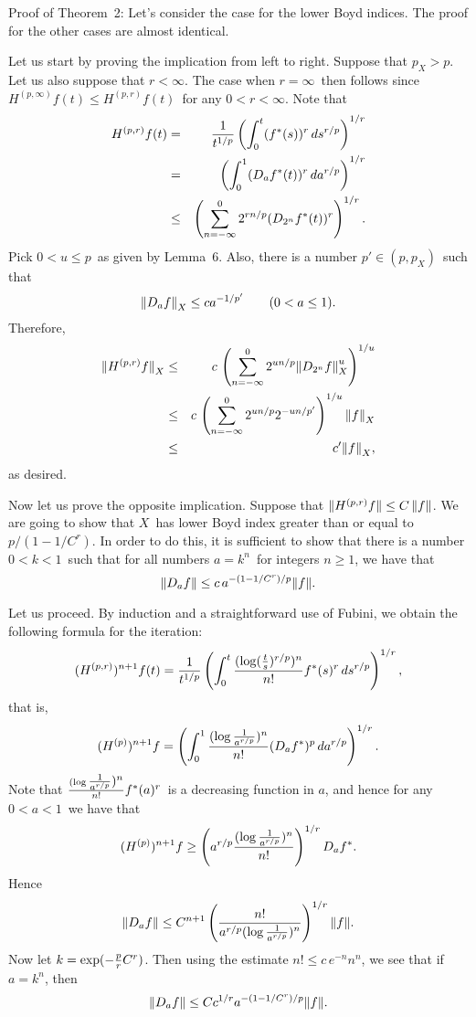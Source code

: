\noindent
Proof of Theorem~2:
Let's consider the case for the lower Boyd indices.  The proof for the
other cases are almost identical.

Let us start by proving the implication from left to right.
Suppose that $p_X > p$.  Let us also suppose that $r < \infty$.  The
case when $r = \infty$\ then follows since $H^{(p,\infty)}f(t) \le
H^{(p,r)}f(t)$\ for any $0<r<\infty$.
Note that
\begin{eqnarray*}
   H^{(p,r)} f(t)
   &=&
   {1\over t^{1/p}}\left(\int_0^t (f^*(s))^r \, ds^{r/p} \right)^{1/r} \\
   &=&
   \left(\int_0^1 (D_af^*(t))^r \, da^{r/p}\right)^{1/r} \\
   &\le&
   \left(\sum_{n=-\infty}^0 2^{rn/p} (D_{2^n} f^*(t))^r \right)^{1/r} .
\end{eqnarray*}
Pick $0<u\le p$\ as given by Lemma~6.
Also, there is a number $p'\in (p,p_X)$\ such that
$$ {\mathopen\| D_a f \mathclose\|}_X \le c a^{-1/p'} \qquad (0<a\le 1). $$
Therefore,
\begin{eqnarray*}
   {\mathopen\| H^{(p,r)} f \mathclose\|}_X
   &\le&
   c \, \left(
   \sum_{n=-\infty}^0 2^{un/p} {\mathopen\| D_{2^n} f \mathclose\|}_X^u \right)^{1/u} \\
   &\le& c \, \left(
   \sum_{n=-\infty}^0 2^{un/p} 2^{-un/p'} \right)^{1/u} {\mathopen\| f \mathclose\|}_X \\
   &\le& c' {\mathopen\| f \mathclose\|}_X ,
\end{eqnarray*}
as desired.

Now let us prove the opposite implication.
Suppose that ${\mathopen\| H^{(p,r)} f \mathclose\|} \le C \, {\mathopen\| f \mathclose\|}$.
We are going to show that $X$\ has lower Boyd index greater than or equal
to $p/(1-1/C^r)$.  In order to do this, it is sufficient to show that
there is a number $0 < k < 1$\ such that for all numbers $a = k^n$\ for
integers $n \ge 1$, we have that 
$$ {\mathopen\| D_a f \mathclose\|} \le c\, a^{-(1-1/C^r)/p} {\left\| f \right\|} .$$

Let us proceed.
By induction and a straightforward use of Fubini, we obtain the following
formula for the iteration:
$$ (H^{(p,r)})^{n+1} f(t) = {1\over t^{1/p}}\left( \int_0^t
   {(\log(\textstyle{t\over s})^{r/p})^n 
   \over n!} f^*(s)^r \, ds^{r/p} \right)^{1/r} ,$$
that is,
$$ (H^{(p)})^{n+1} f = \left(\int_0^1 
   {(\log\textstyle{1\over a^{r/p}})^n \over n!} 
   (D_a f^*)^p \, da^{r/p} \right)^{1/r}.$$
Note that ${(\log\textstyle{1\over a^{r/p}})^n 
\over n!} f^*(a)^r$\ is a decreasing
function in $a$, and hence for any $0<a<1$\ we have that
$$ (H^{(p)})^{n+1} f \ge \left(a^{r/p}
   {(\log\textstyle{1\over a^{r/p}})^n \over n!} \right)^{1/r} D_a f^* .$$
Hence
$$ {\mathopen\| D_a f \mathclose\|} \le C^{n+1} \left({n! \over a^{r/p}
   (\log\textstyle{1\over a^{r/p}})^n}
   \right)^{1/r} {\mathopen\| f \mathclose\|} .$$
Now let $k = \exp(-\textstyle{p\over r}C^r)$.  
Then using the estimate $n! \le c\, e^{-n} n^n$, 
we see that if $a = k^n$, then
$$ {\mathopen\| D_a f \mathclose\|} \le C c^{1/r} a^{-(1-1/C^r)/p} {\left\| f \right\|} .$$
\endproof

